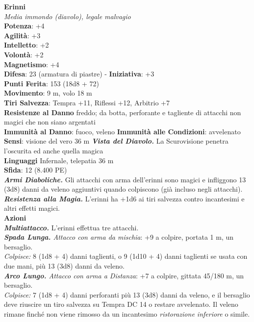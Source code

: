 \begin{multicols}{2}
\medskip\textbf{Erinni}\\
\emph{Media immondo (diavolo), legale malvagio}\\
\textbf{Potenza}: +4\\
\textbf{Agilità}: +3\\
\textbf{Intelletto}: +2\\
\textbf{Volontà}: +2\\
\textbf{Magnetismo}: +4\\
\textbf{Difesa}: 23 (armatura di piastre) - \textbf{Iniziativa}: +3\\
\textbf{Punti Ferita}: 153 (18d8 + 72)\\
\textbf{Movimento}: 9 m, volo 18 m\\
\textbf{Tiri Salvezza}: Tempra +11, Riflessi +12, Arbitrio +7\\
\textbf{Resistenze al Danno} freddo; da botta, perforante e tagliente di attacchi non magici che non siano argentati\\
\textbf{Immunità al Danno}: fuoco, veleno
\textbf{Immunità alle Condizioni}: avvelenato\\
\textbf{Sensi}: visione del vero 36 m
\emph{\textbf{Vista del Diavolo.}} La Scurovisione penetra l'oscurita ed anche quella magica\\
\textbf{Linguaggi} Infernale, telepatia 36 m \\
\textbf{Sfida}: 12 (8.400 PE)\smallskip\\
\emph{\textbf{Armi Diaboliche.}} Gli attacchi con arma dell'erinni sono magici e infliggono 13 (3d8) danni da veleno aggiuntivi quando colpiscono (già incluso negli attacchi).\\
\emph{\textbf{Resistenza alla Magia.}} L'erinni ha +1d6 ai tiri salvezza contro incantesimi e altri effetti magici.\\
\smallskip\textbf{Azioni}\\
\emph{\textbf{Multiattacco.}} L'erinni effettua tre attacchi.\\
\emph{\textbf{Spada Lunga.} Attacco con arma da mischia}: +9 a colpire, portata 1 m, un bersaglio.\\
\emph{Colpisce:} 8 (1d8 + 4) danni taglienti, o 9 (1d10 + 4) danni taglienti se usata con due mani, più 13 (3d8) danni da veleno. \\
\emph{\textbf{Arco Lungo.} Attacco con arma a Distanza}: +7 a colpire, gittata 45/180 m, un bersaglio. \\
\emph{Colpisce:} 7 (1d8 + 4) danni perforanti più 13 (3d8) danni da veleno, e il bersaglio deve riuscire un tiro salvezza su Tempra DC 14 o restare avvelenato. Il veleno rimane finché non viene rimosso da un incantesimo \emph{ristorazione inferiore} o simile.\\

\end{multicols}
